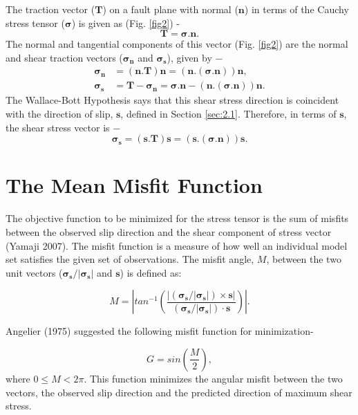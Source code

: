 The traction vector ($\bm{T}$) on a fault plane with normal ($\bm{n}$) in terms of the Cauchy stress tensor ($\bm{\sigma}$) is given as (Fig. \ref{fig2}) - 
\begin{equation}
\label{10}
\bm{T} = \bm{\sigma}.\bm{n}.
\end{equation}
The normal and tangential components of this vector (Fig. \ref{fig2}) are the normal and shear traction vectors ($\bm{\sigma_{n}}$ and $\bm{\sigma_{s}}$), given by $-$
\begin{align}
\label{11}
\bm{\sigma_{n}} &= (\bm{n} . \bm{T}) \bm{n} = (\bm{n} . (\bm{\sigma}.\bm{n}))\bm{n},\\
\label{eq:15}
\bm{\sigma_{s}} &= \bm{T} - \bm{\sigma_{n}} = \bm{\sigma}.\bm{n} - (\bm{n} . (\bm{\sigma}.\bm{n}))\bm{n}.
\end{align}
The Wallace-Bott Hypothesis says that this shear stress direction is coincident with the direction of slip, $\bm{s}$, defined in Section \ref{sec:2.1}. Therefore, in terms of $\bm{s}$, the shear stress vector is $-$
\begin{equation}
\label{13}
\bm{\sigma_{s}} = (\bm{s} . \bm{T})\bm{s} = (\bm{s} . (\bm{\sigma}.\bm{n}))\bm{s}.
\end{equation}

\section{The Mean Misfit Function}
The objective function to be minimized for the stress tensor is the sum of misfits between the observed slip direction and the shear component of stress vector (Yamaji 2007). The misfit function is a measure of how well an individual model set satisfies the given set of observations. The misfit angle, $M$, between the two unit vectors ($\bm{\sigma_{s}}/|\bm{\sigma_{s}}|$ and $\bm{s}$) is defined as:

\begin{equation} \label{14}
M = \left|tan^{-1} \left(\frac{|  (\bm{\sigma_{s}}/|\bm{\sigma_{s}}|) \times \bm{s}|}{ (\bm{\sigma_{s}}/|\bm{\sigma_{s}}|) \cdot \bm{s}}\right)\right|.
\end{equation}  

Angelier (1975) suggested the following misfit function for minimization-

\begin{equation} \label{15}
G = sin\left(\frac{M}{2}\right),
\end{equation} 
where $0 \le M < 2\pi$. This function minimizes the angular misfit between the two vectors, the observed slip direction and the predicted direction of maximum shear stress.

